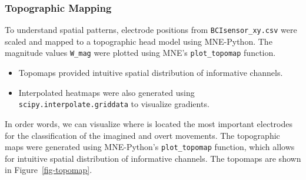 \documentclass[
  letterpaper,
  DIV=11,
  numbers=noendperiod]{scrartcl}
\providecommand{\tightlist}{%
  \setlength{\itemsep}{0pt}\setlength{\parskip}{0pt}}\usepackage{longtable,booktabs,array}
\begin{document}
\subsubsection{Topographic Mapping}\label{topographic-mapping}

To understand spatial patterns, electrode positions from
\texttt{BCIsensor\_xy.csv} were scaled and mapped to a topographic head
model using MNE-Python. The magnitude values \texttt{W\_mag} were
plotted using MNE's \texttt{plot\_topomap} function.

\begin{itemize}
\tightlist
\item
  Topomaps provided intuitive spatial distribution of informative
  channels.
\item
  Interpolated heatmaps were also generated using
  \texttt{scipy.interpolate.griddata} to visualize gradients.
\end{itemize}

In order words, we can visualize where is located the most important
electrodes for the classification of the imagined and overt movements.
The topographic maps were generated using MNE-Python's
\texttt{plot\_topomap} function, which allows for intuitive spatial
distribution of informative channels. The topomaps are shown in
Figure~\ref{fig-topomap}.
\end{document}
